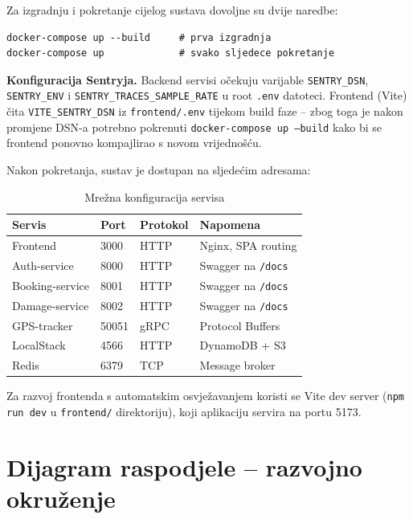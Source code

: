 \documentclass[12pt,a4paper]{article}
\begin{document}
Za izgradnju i pokretanje cijelog sustava dovoljne su dvije naredbe:

\begin{lstlisting}
docker-compose up --build     # prva izgradnja
docker-compose up             # svako sljedece pokretanje
\end{lstlisting}

\begin{infobox}
\textbf{Konfiguracija Sentryja.} Backend servisi očekuju varijable \texttt{SENTRY\_DSN}, \texttt{SENTRY\_ENV} i \texttt{SENTRY\_TRACES\_SAMPLE\_RATE} u root \texttt{.env} datoteci. Frontend (Vite) čita \texttt{VITE\_SENTRY\_DSN} iz \texttt{frontend/.env} tijekom build faze -- zbog toga je nakon promjene DSN-a potrebno pokrenuti \texttt{docker-compose up --build} kako bi se frontend ponovno kompajlirao s novom vrijednošću.
\end{infobox}

Nakon pokretanja, sustav je dostupan na sljedećim adresama:

\begin{table}[H]
\centering
\caption{Mrežna konfiguracija servisa}
\label{tab:ports}
\begin{tabularx}{\textwidth}{l l l X}
\toprule
\textbf{Servis} & \textbf{Port} & \textbf{Protokol} & \textbf{Napomena} \\
\midrule
Frontend & 3000 & HTTP & Nginx, SPA routing \\
Auth-service & 8000 & HTTP & Swagger na \texttt{/docs} \\
Booking-service & 8001 & HTTP & Swagger na \texttt{/docs} \\
Damage-service & 8002 & HTTP & Swagger na \texttt{/docs} \\
GPS-tracker & 50051 & gRPC & Protocol Buffers \\
LocalStack & 4566 & HTTP & DynamoDB + S3 \\
Redis & 6379 & TCP & Message broker \\
\bottomrule
\end{tabularx}
\end{table}

Za razvoj frontenda s automatskim osvježavanjem koristi se Vite dev server (\texttt{npm run dev} u \texttt{frontend/} direktoriju), koji aplikaciju servira na portu 5173.

\section{Dijagram raspodjele -- razvojno okruženje}
\end{document}
